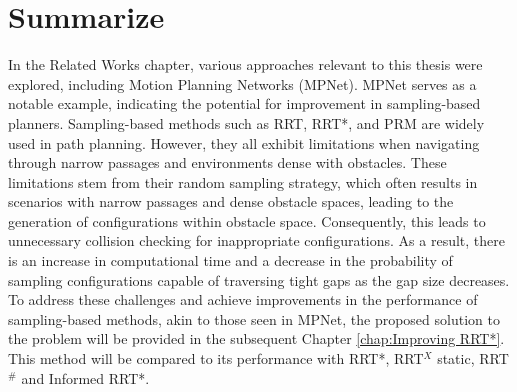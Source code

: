 \documentclass{ctuthesis}
\begin{document}
\section{Summarize}
In the Related Works chapter, various approaches relevant to this thesis were explored, 
including Motion Planning Networks (MPNet). 
MPNet serves as a notable example, indicating the potential for improvement in 
sampling-based planners. 
Sampling-based methods such as RRT, RRT*, and PRM are widely used in path planning. 
However, they all exhibit limitations when navigating through narrow passages and 
environments dense with obstacles. 
These limitations stem from their random sampling strategy, 
which often results in scenarios with narrow passages and dense obstacle spaces, 
leading to the generation of configurations within obstacle space. 
Consequently, this leads to unnecessary collision checking for inappropriate configurations. 
As a result, there is an increase in computational time and a decrease in the probability 
of sampling configurations capable of traversing tight gaps as the gap size decreases. 
To address these challenges and achieve improvements in the performance of sampling-based methods,
akin to those seen in MPNet, 
the proposed solution to the problem will be provided in the subsequent Chapter \ref{chap:Improving RRT*}.
This method will be compared to its performance with RRT*, RRT$^X$ static, RRT$^\#$ and Informed RRT*.
\end{document}
